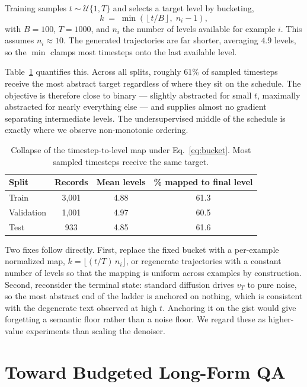 \documentclass{article}
\begin{document}
Training samples $t \sim \mathcal{U}\{1,T\}$ and selects a target level by bucketing,
\begin{equation}
k \;=\; \min\!\left(\left\lfloor t / B \right\rfloor,\; n_i - 1\right),
\label{eq:bucket}
\end{equation}
with $B{=}100$, $T{=}1000$, and $n_i$ the number of levels available for example $i$. This assumes $n_i \approx 10$. The generated trajectories are far shorter, averaging $4.9$ levels, so the $\min$ clamps most timesteps onto the last available level.

Table~\ref{tab:collapse} quantifies this. Across all splits, roughly $61\%$ of sampled timesteps receive the most abstract target regardless of where they sit on the schedule. The objective is therefore close to binary --- slightly abstracted for small $t$, maximally abstracted for nearly everything else --- and supplies almost no gradient separating intermediate levels. The undersupervised middle of the schedule is exactly where we observe non-monotonic ordering.

\begin{table}[h]
  \centering
  \small
  \caption{Collapse of the timestep-to-level map under Eq.~\ref{eq:bucket}. Most sampled timesteps receive the same target.}
  \label{tab:collapse}
  \begin{tabular}{lccc}
    \toprule
    Split & Records & Mean levels & \% mapped to final level \\
    \midrule
    Train      & 3{,}001 & 4.88 & 61.3 \\
    Validation & 1{,}001 & 4.97 & 60.5 \\
    Test       & 933     & 4.85 & 61.6 \\
    \bottomrule
  \end{tabular}
\end{table}

Two fixes follow directly. First, replace the fixed bucket with a per-example normalized map, $k = \lfloor (t/T)\, n_i \rfloor$, or regenerate trajectories with a constant number of levels so that the mapping is uniform across examples by construction. Second, reconsider the terminal state: standard diffusion drives $v_T$ to pure noise, so the most abstract end of the ladder is anchored on nothing, which is consistent with the degenerate text observed at high $t$. Anchoring it on the gist would give forgetting a semantic floor rather than a noise floor. We regard these as higher-value experiments than scaling the denoiser.

\section{Toward Budgeted Long-Form QA}
\label{sec:qa}
\end{document}
